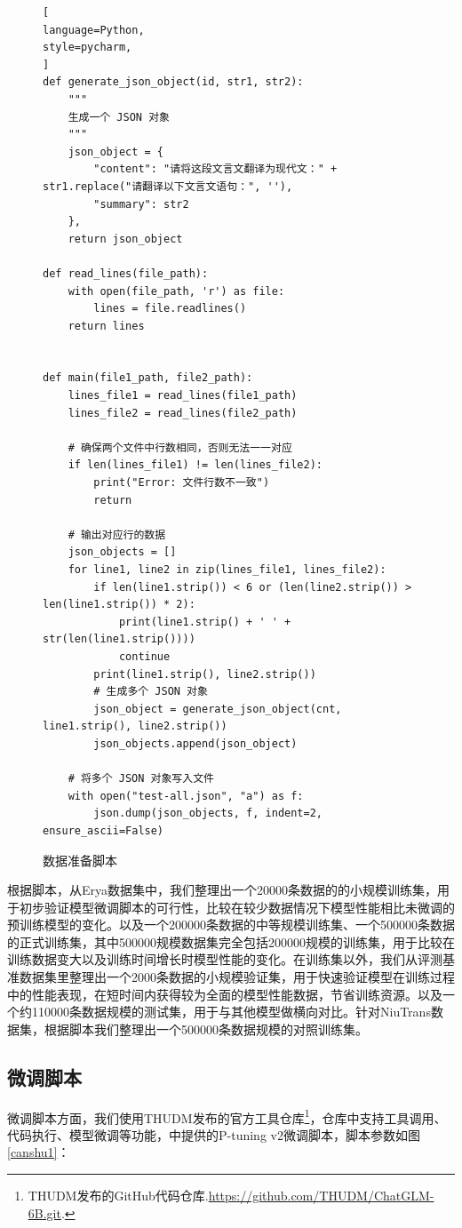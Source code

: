 \documentclass[
    decl-page,  %
    ,fontset = win, %
  ]{njuthesis}
\begin{document}
\begin{figure}[H]
    \centering
    {\linespread{1.0}
\begin{lstlisting}[   
language=Python, 
style=pycharm,
]
def generate_json_object(id, str1, str2):
    """
    生成一个 JSON 对象
    """
    json_object = {
        "content": "请将这段文言文翻译为现代文：" + str1.replace("请翻译以下文言文语句：", ''),
        "summary": str2
    },
    return json_object

def read_lines(file_path):
    with open(file_path, 'r') as file:
        lines = file.readlines()
    return lines


def main(file1_path, file2_path):
    lines_file1 = read_lines(file1_path)
    lines_file2 = read_lines(file2_path)

    # 确保两个文件中行数相同，否则无法一一对应
    if len(lines_file1) != len(lines_file2):
        print("Error: 文件行数不一致")
        return

    # 输出对应行的数据
    json_objects = []
    for line1, line2 in zip(lines_file1, lines_file2):
        if len(line1.strip()) < 6 or (len(line2.strip()) > len(line1.strip()) * 2):
            print(line1.strip() + ' ' + str(len(line1.strip())))
            continue
        print(line1.strip(), line2.strip())
        # 生成多个 JSON 对象
        json_object = generate_json_object(cnt, line1.strip(), line2.strip())
        json_objects.append(json_object)

    # 将多个 JSON 对象写入文件
    with open("test-all.json", "a") as f:
        json.dump(json_objects, f, indent=2, ensure_ascii=False)
\end{lstlisting}
}
    \caption{数据准备脚本}
    \label{python}
\end{figure}

根据脚本，从Erya数据集中，我们整理出一个20000条数据的的小规模训练集，用于初步验证模型微调脚本的可行性，比较在较少数据情况下模型性能相比未微调的预训练模型的变化。以及一个200000条数据的中等规模训练集、一个500000条数据的正式训练集，其中500000规模数据集完全包括200000规模的训练集，用于比较在训练数据变大以及训练时间增长时模型性能的变化。在训练集以外，我们从评测基准数据集里整理出一个2000条数据的小规模验证集，用于快速验证模型在训练过程中的性能表现，在短时间内获得较为全面的模型性能数据，节省训练资源。以及一个约110000条数据规模的测试集，用于与其他模型做横向对比。针对NiuTrans数据集，根据脚本我们整理出一个500000条数据规模的对照训练集。

\subsection{微调脚本}
微调脚本方面，我们使用THUDM发布的官方工具仓库\footnote{THUDM发布的GitHub代码仓库.\url{https://github.com/THUDM/ChatGLM-6B.git}.}，仓库中支持工具调用、代码执行、模型微调等功能，中提供的P-tuning v2微调脚本，脚本参数如图\ref{canshu1}：
\end{document}

